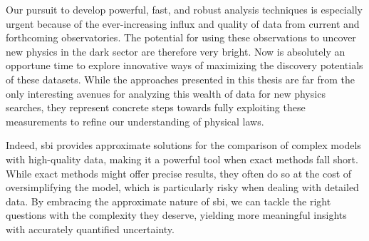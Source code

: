 Our pursuit to develop powerful, fast, and robust analysis techniques is especially urgent because of the ever-increasing influx and quality of data from current and forthcoming observatories.
The potential for using these observations to uncover new physics in the dark sector are therefore very bright. Now is absolutely an opportune time to explore innovative ways of maximizing the discovery potentials of these datasets. While the approaches presented in this thesis are far from the only interesting avenues for analyzing this wealth of data for new physics searches, they represent concrete steps towards fully exploiting these measurements to refine our understanding of physical laws.

Indeed, \gls*{sbi} provides approximate solutions for the comparison of complex models with high-quality data, making it a powerful tool when exact methods fall short. While exact methods might offer precise results, they often do so at the cost of oversimplifying the model, which is particularly risky when dealing with detailed data. By embracing the approximate nature of \gls*{sbi}, we can tackle the right questions with the complexity they deserve, yielding more meaningful insights with accurately quantified uncertainty.

%




